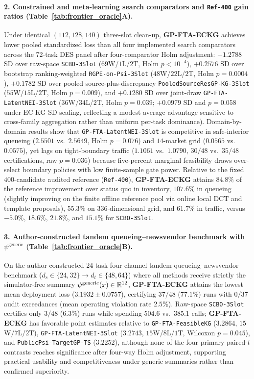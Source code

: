 \paragraph{2. Constrained and meta-learning search comparators and \texttt{Ref-400} gain ratios (Table~\ref{tab:frontier_oracle}A).}
Under identical $(112, 128, 140)$ three-slot clean-up, \textbf{GP-FTA-ECKG} achieves lower pooled standardized loss than all four implemented search comparators across the $72$-task DES panel after four-comparator Holm adjustment: $+1.2788$ SD over raw-space \texttt{SCBO-3Slot} ($69$W/$1$L/$2$T, Holm $p < 10^{-4}$), $+0.2576$ SD over bootstrap ranking-weighted \texttt{RGPE-on-Psi-3Slot} ($48$W/$22$L/$2$T, Holm $p = 0.0004$), $+0.1782$ SD over pooled source-plus-discrepancy \texttt{PooledSourceResGP-KG-3Slot} ($55$W/$15$L/$2$T, Holm $p = 0.009$), and $+0.1280$ SD over joint-draw \texttt{GP-FTA-LatentNEI-3Slot} ($36$W/$34$L/$2$T, Holm $p = 0.039$; $+0.0979$ SD and $p=0.058$ under EC-KG SD scaling, reflecting a modest average advantage sensitive to cross-family aggregation rather than uniform per-task dominance). Domain-by-domain results show that \texttt{GP-FTA-LatentNEI-3Slot} is competitive in safe-interior queueing ($2.5501$ vs.\ $2.5649$, Holm $p=0.076$) and $14$-market grid ($0.0565$ vs.\ $0.0575$), yet lags on tight-boundary traffic ($1.1061$ vs.\ $1.0790$, $30/48$ vs.\ $35/48$ certifications, raw $p=0.036$) because five-percent marginal feasibility draws over-select boundary policies with low finite-sample gate power. Relative to the fixed $400$-candidate audited reference (\texttt{Ref-400}), \textbf{GP-FTA-ECKG} attains $84.8\%$ of the reference improvement over status quo in inventory, $107.6\%$ in queueing (slightly improving on the finite offline reference pool via online local DCT and template proposals), $55.3\%$ on $336$-dimensional grid, and $61.7\%$ in traffic, versus $-5.0\%$, $18.6\%$, $21.8\%$, and $15.1\%$ for \texttt{SCBO-3Slot}.

\paragraph{3. Author-constructed tandem queueing--newsvendor benchmark with $\psi^{\mathrm{generic}}$ (Table~\ref{tab:frontier_oracle}B).}
On the author-constructed $24$-task four-channel tandem queueing--newsvendor benchmark ($d_s\in\{24,32\}\to d_t\in\{48,64\}$) where all methods receive strictly the simulator-free summary $\psi^{\mathrm{generic}}(x)\in\mathbb{R}^{12}$, \textbf{GP-FTA-ECKG} attains the lowest mean deployment loss ($3.1932 \pm 0.0757$), certifying $37/48$ ($77.1\%$) runs with $0/37$ audit exceedances (mean operating violation rate $2.5\%$). Raw-space \texttt{SCBO-3Slot} certifies only $3/48$ ($6.3\%$) runs while spending $504.6$ vs.\ $385.1$ calls; \textbf{GP-FTA-ECKG} has favorable point estimates relative to \texttt{GP-FTA-FeasibleKG} ($3.2864$, $15$W/$7$L/$2$T), \texttt{GP-FTA-LatentNEI-3Slot} ($3.2743$, $15$W/$8$L/$1$T, Wilcoxon $p=0.045$), and \texttt{PublicPsi-TargetGP-TS} ($3.2252$), although none of the four primary paired-$t$ contrasts reaches significance after four-way Holm adjustment, supporting practical usability and competitiveness under generic summaries rather than confirmed superiority.

